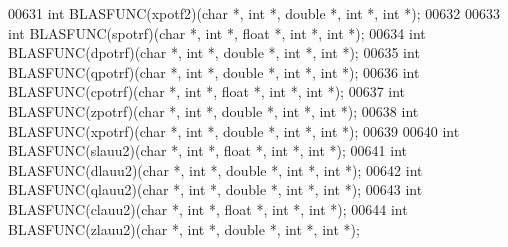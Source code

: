 \begin{DoxyCode}
00631 \textcolor{keywordtype}{int} BLASFUNC(xpotf2)(\textcolor{keywordtype}{char} *, \textcolor{keywordtype}{int} *, \textcolor{keywordtype}{double} *, \textcolor{keywordtype}{int} *, \textcolor{keywordtype}{int} *);
00632 
00633 \textcolor{keywordtype}{int} BLASFUNC(spotrf)(\textcolor{keywordtype}{char} *, \textcolor{keywordtype}{int} *, \textcolor{keywordtype}{float}  *, \textcolor{keywordtype}{int} *, \textcolor{keywordtype}{int} *);
00634 \textcolor{keywordtype}{int} BLASFUNC(dpotrf)(\textcolor{keywordtype}{char} *, \textcolor{keywordtype}{int} *, \textcolor{keywordtype}{double} *, \textcolor{keywordtype}{int} *, \textcolor{keywordtype}{int} *);
00635 \textcolor{keywordtype}{int} BLASFUNC(qpotrf)(\textcolor{keywordtype}{char} *, \textcolor{keywordtype}{int} *, \textcolor{keywordtype}{double} *, \textcolor{keywordtype}{int} *, \textcolor{keywordtype}{int} *);
00636 \textcolor{keywordtype}{int} BLASFUNC(cpotrf)(\textcolor{keywordtype}{char} *, \textcolor{keywordtype}{int} *, \textcolor{keywordtype}{float}  *, \textcolor{keywordtype}{int} *, \textcolor{keywordtype}{int} *);
00637 \textcolor{keywordtype}{int} BLASFUNC(zpotrf)(\textcolor{keywordtype}{char} *, \textcolor{keywordtype}{int} *, \textcolor{keywordtype}{double} *, \textcolor{keywordtype}{int} *, \textcolor{keywordtype}{int} *);
00638 \textcolor{keywordtype}{int} BLASFUNC(xpotrf)(\textcolor{keywordtype}{char} *, \textcolor{keywordtype}{int} *, \textcolor{keywordtype}{double} *, \textcolor{keywordtype}{int} *, \textcolor{keywordtype}{int} *);
00639 
00640 \textcolor{keywordtype}{int} BLASFUNC(slauu2)(\textcolor{keywordtype}{char} *, \textcolor{keywordtype}{int} *, \textcolor{keywordtype}{float}  *, \textcolor{keywordtype}{int} *, \textcolor{keywordtype}{int} *);
00641 \textcolor{keywordtype}{int} BLASFUNC(dlauu2)(\textcolor{keywordtype}{char} *, \textcolor{keywordtype}{int} *, \textcolor{keywordtype}{double} *, \textcolor{keywordtype}{int} *, \textcolor{keywordtype}{int} *);
00642 \textcolor{keywordtype}{int} BLASFUNC(qlauu2)(\textcolor{keywordtype}{char} *, \textcolor{keywordtype}{int} *, \textcolor{keywordtype}{double} *, \textcolor{keywordtype}{int} *, \textcolor{keywordtype}{int} *);
00643 \textcolor{keywordtype}{int} BLASFUNC(clauu2)(\textcolor{keywordtype}{char} *, \textcolor{keywordtype}{int} *, \textcolor{keywordtype}{float}  *, \textcolor{keywordtype}{int} *, \textcolor{keywordtype}{int} *);
00644 \textcolor{keywordtype}{int} BLASFUNC(zlauu2)(\textcolor{keywordtype}{char} *, \textcolor{keywordtype}{int} *, \textcolor{keywordtype}{double} *, \textcolor{keywordtype}{int} *, \textcolor{keywordtype}{int} *);

\end{DoxyCode}

